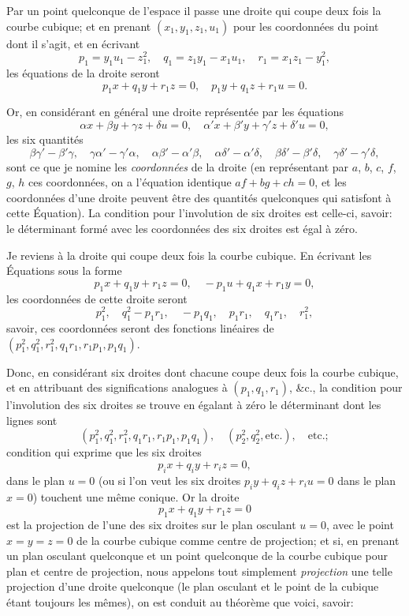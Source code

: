 \documentclass[11pt,a4paper]{article}
\begin{document}
Par un point quelconque de l'espace il passe une droite qui coupe deux fois la courbe cubique; et en prenant $(x_1, y_1, z_1, u_1)$ pour les coordonn\'{e}es du point dont il s'agit, et en \'{e}crivant
\[
p_1 = y_1 u_1 - z_1^2, \quad q_1 = z_1 y_1 - x_1 u_1, \quad r_1 = x_1 z_1 - y_1^2,
\]
les \'{e}quations de la droite seront
\[
p_1 x + q_1 y + r_1 z = 0, \quad p_1 y + q_1 z + r_1 u = 0.
\]

Or, en consid\'{e}rant en g\'{e}n\'{e}ral une droite repr\'{e}sent\'{e}e par les \'{e}quations
\[
\alpha x + \beta y + \gamma z + \delta u = 0, \quad \alpha' x + \beta' y + \gamma' z + \delta' u = 0,
\]
les six quantit\'{e}s
\[
\beta\gamma' - \beta'\gamma, \quad \gamma\alpha' - \gamma'\alpha, \quad \alpha\beta' - \alpha'\beta, \quad \alpha\delta' - \alpha'\delta, \quad \beta\delta' - \beta'\delta, \quad \gamma\delta' - \gamma'\delta,
\]
sont ce que je nomine les \textit{coordonn\'{e}es} de la droite (en repr\'{e}sentant par $a$, $b$, $c$, $f$, $g$, $h$ ces coordonn\'{e}es, on a l'\'{e}quation identique $af + bg + ch = 0$, et les coordonn\'{e}es d'une droite peuvent \^{e}tre des quantit\'{e}s quelconques qui satisfont \`{a} cette \'{E}quation). La condition pour l'involution de six droites est celle-ci, savoir: le d\'{e}terminant form\'{e} avec les coordonn\'{e}es des six droites est \'{e}gal \`{a} z\'{e}ro.

Je reviens \`{a} la droite qui coupe deux fois la courbe cubique. En \'{e}crivant les \'{E}quations sous la forme
\[
p_1 x + q_1 y + r_1 z = 0, \quad -p_1 u + q_1 x + r_1 y = 0,
\]
les coordonn\'{e}es de cette droite seront
\[
p_1^2, \quad q_1^2 - p_1 r_1, \quad -p_1 q_1, \quad p_1 r_1, \quad q_1 r_1, \quad r_1^2,
\]
savoir, ces coordonn\'{e}es seront des fonctions lin\'{e}aires de $(p_1^2, q_1^2, r_1^2, q_1 r_1, r_1 p_1, p_1 q_1)$.

Donc, en consid\'{e}rant six droites dont chacune coupe deux fois la courbe cubique, et en attribuant des significations analogues \`{a} $(p_1, q_1, r_1)$, \&c., la condition pour l'involution des six droites se trouve en \'{e}galant \`{a} z\'{e}ro le d\'{e}terminant dont les lignes sont
\[
(p_1^2, q_1^2, r_1^2, q_1 r_1, r_1 p_1, p_1 q_1), \quad (p_2^2, q_2^2, \text{etc.}), \quad \text{etc.};
\]
condition qui exprime que les six droites
\[
p_i x + q_i y + r_i z = 0,
\]
dans le plan $u = 0$ (ou si l'on veut les six droites $p_i y + q_i z + r_i u = 0$ dans le plan $x = 0$) touchent une m\^{e}me conique. Or la droite
\[
p_1 x + q_1 y + r_1 z = 0
\]
est la projection de l'une des six droites sur le plan osculant $u = 0$, avec le point $x = y = z = 0$ de la courbe cubique comme centre de projection; et si, en prenant un plan osculant quelconque et un point quelconque de la courbe cubique pour plan et centre de projection, nous appelons tout simplement \textit{projection} une telle projection d'une droite quelconque (le plan osculant et le point de la cubique \'{e}tant toujours les m\^{e}mes), on est conduit au th\'{e}or\`{e}me que voici, savoir:
\end{document}
